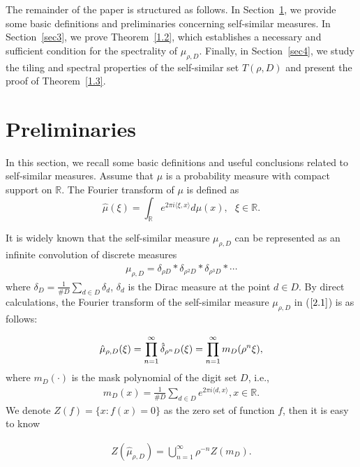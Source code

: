 \documentclass[11pt]{article}
\numberwithin{equation}{section}
\begin{document}
The remainder of the paper is structured as follows.
In Section~\ref{sec2}, we provide some basic definitions and preliminaries concerning self-similar measures.
In Section~\ref{sec3},  we prove Theorem~\ref{1.2}, which establishes  a necessary and sufficient condition for the spectrality of $\mu_{\rho,D}$.
Finally, in Section~\ref{sec4}, we study the tiling and spectral properties of the self-similar set $T(\rho,D)$ and present the proof of Theorem~\ref{1.3}.


\section{Preliminaries}\label{sec2}


In this section, we recall some basic definitions and useful conclusions related to self-similar measures. Assume that $\mu$ is a probability measure with compact support on $\mathbb{R}$. The Fourier transform of $\mu$ is defined as
$$\hat{\mu}(\xi)=\int_{\mathbb{R}} e^{2 \pi i \langle \xi, x \rangle}d\mu(x), ~~~\xi \in \mathbb{R}. $$

It is widely known that the self-similar measure $\mu_{\rho,D}$ can be represented as an infinite convolution of discrete measures
\begin{align}\label{2.1}
	\mu_{\rho,D}=\delta_{\rho D}\ast\delta_{\rho^2 D}\ast\delta_{\rho^3 D}\ast\cdots
\end{align}
where $\delta_{D}=\frac{1}{\#D}\sum_{d\in D}\delta_{d}$, $\delta_{d}$ is the Dirac measure at the point $d\in D$. By direct calculations, the Fourier transform of the self-similar measure $\mu_{\rho,D}$ in ($\ref{2.1}$) is as follows:

\begin{equation}
	\hat{\mu}_{\rho,D}(\xi)=\prod^{\infty}_{n=1}\hat{\delta}_{\rho^n D}(\xi)=\prod^{\infty}_{n=1}m_{D}(\rho^{n}\xi),  \notag
\end{equation}
where $m_D(\cdot)$ is the mask polynomial of the digit set $D$, i.e.,
\begin{align*}
	m_{D}(x)=\frac{1}{\#D}\sum_{d\in D}e^{2\pi i \langle d,x \rangle}, x\in \mathbb{R}.
\end{align*}
We denote $Z(f)=\{x:f(x)=0\}$ as the zero set of function $f$, then it is easy to know

\begin{align}\label{2.2}	Z(\hat{\mu}_{\rho,D})=\bigcup^{\infty}_{n=1}\rho^{-n}Z(m_{D}).
\end{align}
\end{document}

